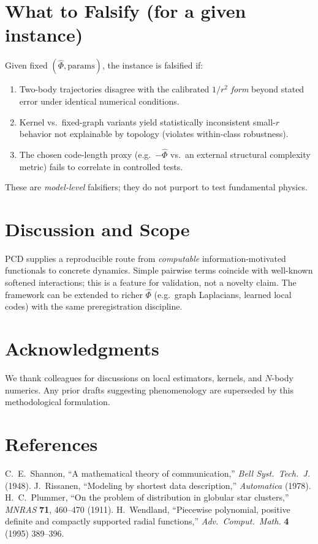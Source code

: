 \documentclass[11pt,a4paper]{article}
\numberwithin{equation}{section}
\begin{document}
\section{What to Falsify (for a given instance)}
Given fixed $(\widehat{\Phi},\text{params})$, the instance is falsified if:
\begin{enumerate}[label=(F\arabic*)]
\item Two-body trajectories disagree with the calibrated $1/r^2$ \emph{form} beyond stated error under identical numerical conditions.
\item Kernel vs.\ fixed-graph variants yield statistically inconsistent small-$r$ behavior not explainable by topology (violates within-class robustness).
\item The chosen code-length proxy (e.g.\ $-\widehat{\Phi}$ vs.\ an external structural complexity metric) fails to correlate in controlled tests.
\end{enumerate}
These are \emph{model-level} falsifiers; they do not purport to test fundamental physics.

\section{Discussion and Scope}
PCD supplies a reproducible route from \emph{computable} information-motivated functionals to concrete dynamics. Simple pairwise terms coincide with well-known softened interactions; this is a feature for validation, not a novelty claim. The framework can be extended to richer $\widehat{\Phi}$ (e.g.\ graph Laplacians, learned local codes) with the same preregistration discipline.

\section*{Acknowledgments}
We thank colleagues for discussions on local estimators, kernels, and $N$-body numerics. Any prior drafts suggesting phenomenology are superseded by this methodological formulation.

\section*{References}
\begin{thebibliography}{9}
C.~E.~Shannon, ``A mathematical theory of communication,'' \emph{Bell Syst.\ Tech.\ J.} (1948).
J.~Rissanen, ``Modeling by shortest data description,'' \emph{Automatica} (1978).
H.~C.~Plummer, ``On the problem of distribution in globular star clusters,'' \emph{MNRAS} \textbf{71}, 460--470 (1911).
H.~Wendland, ``Piecewise polynomial, positive definite and compactly supported radial functions,'' \emph{Adv.\ Comput.\ Math.} \textbf{4} (1995) 389--396.
\end{thebibliography}
\end{document}
